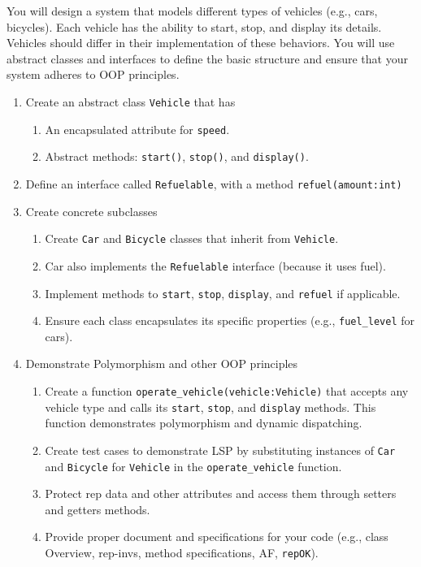 \documentclass[oneside,11pt,dvipsnames]{book}
\newcommand{\code}[1]{\texttt{#1}}
\begin{document}
You will design a system that models different types of vehicles (e.g., cars, bicycles). Each vehicle has the ability to start, stop, and display its details. Vehicles should differ in their implementation of these behaviors. You will use abstract classes and interfaces to define the basic structure and ensure that your system adheres to OOP principles.

\begin{enumerate}
    \item Create an abstract class \code{Vehicle} that has
    \begin{enumerate}
        \item An encapsulated attribute for \code{speed}.
        \item Abstract methods: \code{start()}, \code{stop()}, and \code{display()}.
    \end{enumerate}
    \item Define an interface called \code{Refuelable}, with a method \code{refuel(amount:int)}
    \item Create concrete subclasses
    \begin{enumerate}
	    \item Create \code{Car} and \code{Bicycle} classes that inherit from \code{Vehicle}.
	    \item Car also implements the \code{Refuelable} interface (because it uses fuel).
	    \item Implement methods to \code{start}, \code{stop}, \code{display}, and \code{refuel} if applicable.
	    \item Ensure each class encapsulates its specific properties (e.g., \code{fuel\_level} for cars).
    \end{enumerate}
    \item Demonstrate Polymorphism and other OOP principles
    \begin{enumerate}
        \item Create a function \code{operate\_vehicle(vehicle:Vehicle)} that accepts any vehicle type and calls its \code{start}, \code{stop}, and \code{display} methods. This function demonstrates polymorphism and dynamic dispatching.
        \item Create test cases to demonstrate LSP by substituting instances of \code{Car} and \code{Bicycle} for \code{Vehicle} in the \code{operate\_vehicle} function. 
        \item Protect rep data and other attributes and access them through setters and getters methods.
    \item Provide proper document and specifications for your code (e.g., class Overview, rep-invs, method specifications, AF, \code{repOK}).

\end{enumerate}
\end{enumerate}
\end{document}
